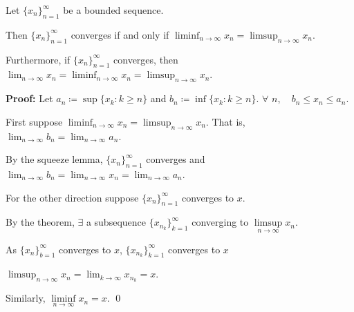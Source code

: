 \documentclass[10pt,aspectratio=169]{beamer}
\begin{document}
\begin{frame}
\begin{proposition}
Let $\{ x_n \}_{n=1}^\infty$ be a bounded sequence.

\pause
Then $\{ x_n \}_{n=1}^\infty$ converges
if and only if
\quad
$\displaystyle
\liminf_{n\to \infty} x_n =
\limsup_{n\to \infty} x_n$.

\pause
Furthermore, if $\{ x_n \}_{n=1}^\infty$ converges, then
\quad
$\displaystyle
\lim_{n\to \infty} x_n =
\liminf_{n\to \infty} x_n =
\limsup_{n\to \infty} x_n$.
\end{proposition}

\pause
\textbf{Proof:}
Let $a_n \coloneqq \sup \{ x_k : k \geq n \}$ and $b_n \coloneqq \inf \{ x_k : k \geq n \}$.
\pause
\quad
$\forall$ $n$, ~
$b_n \leq x_n \leq a_n$.

\pause
\medskip

First suppose $\displaystyle \liminf_{n\to\infty} x_n = \limsup_{n\to\infty} x_n$.  That is,
$\displaystyle \lim_{n\to\infty} b_n = \lim_{n\to\infty} a_n$.

\pause
\medskip

By the squeeze lemma,
$\{ x_n \}_{n=1}^\infty$ converges and
\quad $\displaystyle
\lim_{n\to\infty} b_n
=
\lim_{n\to\infty} x_n
=
\lim_{n\to\infty} a_n$.

\pause
\medskip

For the other direction suppose $\{ x_n \}_{n=1}^\infty$ converges to $x$.

\pause
\medskip

By the theorem, $\exists$ a subsequence
$\{ x_{n_k} \}_{k=1}^\infty$ converging to $\limsup\limits_{n\to\infty} x_n$.

\pause
As $\{ x_n \}_{b=1}^\infty$ converges to $x$,
\quad $\{ x_{n_k} \}_{k=1}^\infty$ converges to $x$

\pause
\thus \quad $\displaystyle \limsup_{n\to\infty} x_n = \lim_{k\to\infty} x_{n_k} = x$.

\pause
\medskip

Similarly, $\liminf\limits_{n\to\infty} x_n = x$.
\qed


\end{frame}
\end{document}
